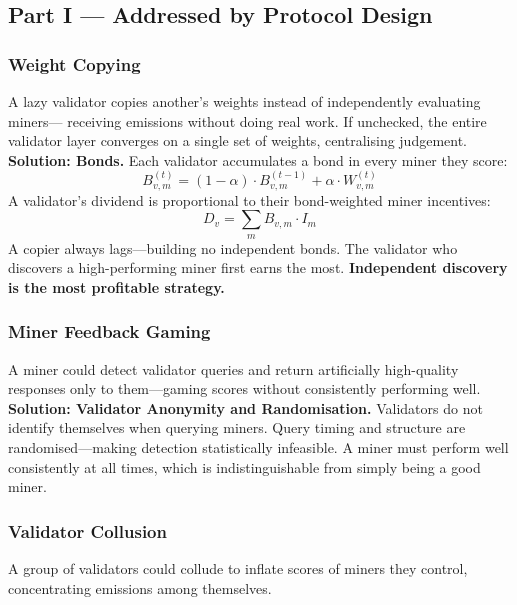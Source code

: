 \documentclass[12pt, a4paper, oneside]{report}
\theoremstyle{definition}
\begin{document}
\subsection*{Part I — Addressed by Protocol Design}

\subsubsection*{Weight Copying}

A lazy validator copies another's weights instead of independently evaluating miners—
receiving emissions without doing real work. If unchecked, the entire validator layer 
converges on a single set of weights, centralising judgement.\\[0.2cm]

\textbf{Solution: Bonds.} Each validator accumulates a bond in every miner they score:
\[
  B_{v,m}^{(t)} = (1-\alpha) \cdot B_{v,m}^{(t-1)} + \alpha \cdot W_{v,m}^{(t)}
\]
A validator's dividend is proportional to their bond-weighted miner incentives:
\[
  D_v = \sum_{m} B_{v,m} \cdot I_m
\]
A copier always lags—building no independent bonds. The validator who discovers a 
high-performing miner first earns the most. \textbf{Independent discovery is the 
most profitable strategy.}


\subsubsection*{Miner Feedback Gaming}

A miner could detect validator queries and return artificially high-quality 
responses only to them—gaming scores without consistently performing well.\\[0.2cm]

\textbf{Solution: Validator Anonymity and Randomisation.} Validators do not 
identify themselves when querying miners. Query timing and structure are 
randomised—making detection statistically infeasible. A miner must perform 
well consistently at all times, which is indistinguishable from simply 
being a good miner.


\subsubsection*{Validator Collusion}

A group of validators could collude to inflate scores of miners they control, 
concentrating emissions among themselves.\\[0.2cm]
\end{document}

